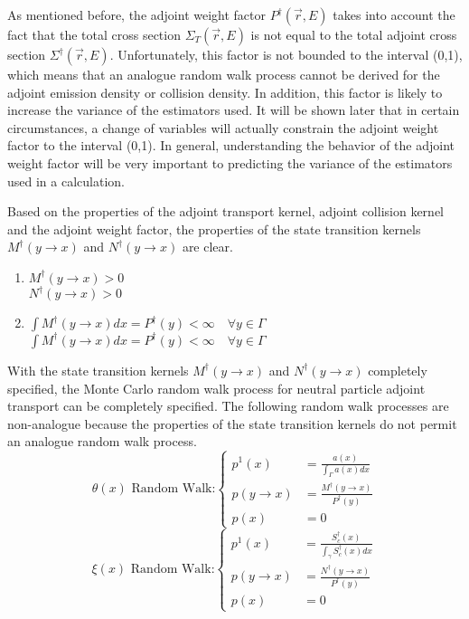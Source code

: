 As mentioned before, the adjoint weight factor $P^{\dagger}(\vec{r},E)$ takes 
into account the fact that the total cross section $\Sigma_T(\vec{r},E)$ is not
equal to the total adjoint cross section $\Sigma^{\dagger}(\vec{r},E)$. 
Unfortunately, this factor is not bounded to the interval (0,1), which means
that an analogue random walk process cannot be derived for the adjoint
emission density or collision density. In addition, this factor is likely to
increase the variance of the estimators used. It will be shown later that in
certain circumstances, a change of variables will actually constrain the 
adjoint weight factor to the interval (0,1). In general, understanding the 
behavior of the adjoint weight factor will be very important to predicting
the variance of the estimators used in a calculation.

Based on the properties of the adjoint transport kernel, adjoint collision
kernel and the adjoint weight factor, the properties of the state transition 
kernels $M^{\dagger}(y \to x)$ and $N^{\dagger}(y \to x)$ are clear.
\begin{enumerate}
  \item $M^{\dagger}(y \to x) > 0$ \\
    $N^{\dagger}(y \to x) > 0$
  \item $\int M^{\dagger}(y \to x)dx = P^{\dagger}(y) < \infty \quad \forall y \in
    \Gamma$ \\
    $\int M^{\dagger}(y \to x)dx = P^{\dagger}(y) < \infty \quad \forall y \in
    \Gamma$
\end{enumerate}

With the state transition kernels $M^{\dagger}(y \to x)$ and $N^{\dagger}(y \to x)$
completely specified, the Monte Carlo random walk process for neutral 
particle adjoint transport can be completely specified. 
The following random walk processes are non-analogue because the properties
of the state transition kernels do not permit an analogue random walk process.
\begin{equation}
  \theta(x)\text{ Random Walk:}
  \begin{cases}
    p^1(x) & = \frac{a(x)}{\int_{\Gamma} a(x)dx} \\
    p(y \to x) & = \frac{M^{\dagger}(y \to x)}{P^{\dagger}(y)} \\
    p(x) & = 0
  \end{cases}
  \label{eq:mc_random_walk_adj_emission_dens}
\end{equation}
\begin{equation}
  \xi(x)\text{ Random Walk:}
  \begin{cases}
    p^1(x) & = \frac{S_c^{\dagger}(x)}{\int_{\gamma} S_c^{\dagger}(x)dx} \\
    p(y \to x) & = \frac{N^{\dagger}(y \to x)}{P^{\dagger}(y)} \\
    p(x) & = 0
  \end{cases}
  \label{eq:mc_random_walk_adj_collision_dens}
\end{equation}


